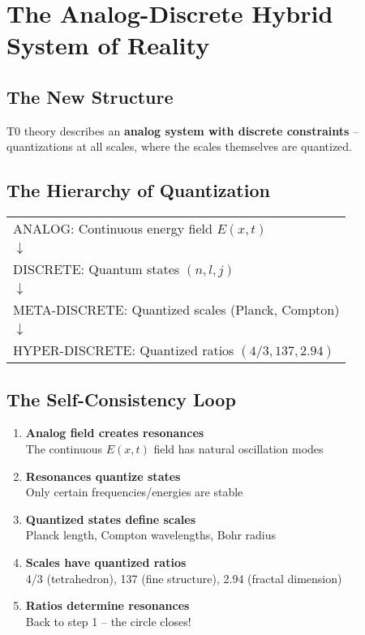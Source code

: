 \documentclass[12pt,a4paper]{article}
\begin{document}
	\section{The Analog-Discrete Hybrid System of Reality}
	
	\subsection{The New Structure}
	
	T0 theory describes an \textbf{analog system with discrete constraints} -- quantizations at all scales, where the scales themselves are quantized.
	
	\subsection{The Hierarchy of Quantization}
	
	\begin{center}
		\begin{tabular}{l}
			ANALOG: Continuous energy field $E(x,t)$\\
			$\downarrow$\\
			DISCRETE: Quantum states $(n, l, j)$\\
			$\downarrow$\\
			META-DISCRETE: Quantized scales (Planck, Compton)\\
			$\downarrow$\\
			HYPER-DISCRETE: Quantized ratios $(4/3, 137, 2.94)$
		\end{tabular}
	\end{center}
	
	\subsection{The Self-Consistency Loop}
	
	\begin{enumerate}
		\item \textbf{Analog field creates resonances}\\
		The continuous $E(x,t)$ field has natural oscillation modes
		
		\item \textbf{Resonances quantize states}\\
		Only certain frequencies/energies are stable
		
		\item \textbf{Quantized states define scales}\\
		Planck length, Compton wavelengths, Bohr radius
		
		\item \textbf{Scales have quantized ratios}\\
		4/3 (tetrahedron), 137 (fine structure), 2.94 (fractal dimension)
		
		\item \textbf{Ratios determine resonances}\\
		Back to step 1 -- the circle closes!
	\end{enumerate}
	
\end{document}
